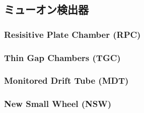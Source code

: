 \subsection{ミューオン検出器}\label{section2-2-4}

\subsubsection{Resisitive Plate Chamber (RPC)}

\subsubsection{Thin Gap Chambers (TGC)}

\subsubsection{Monitored Drift Tube (MDT)}

\subsubsection{New Small Wheel (NSW)}